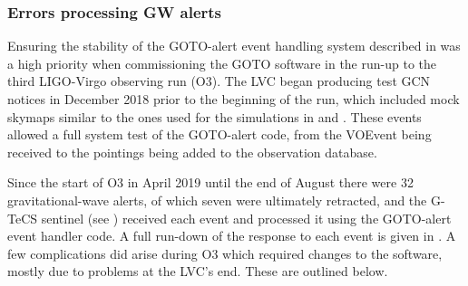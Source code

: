 \begin{colsection}
\clearpage

\subsubsection{Errors processing GW alerts}

Ensuring the stability of the GOTO-alert event handling system described in  was a high priority when commissioning the GOTO software in the run-up to the third LIGO-Virgo observing run (O3). The LVC began producing test GCN notices in December 2018 prior to the beginning of the run, which included mock skymaps similar to the ones used for the simulations in  and . These events allowed a full system test of the GOTO-alert code, from the VOEvent being received to the pointings being added to the observation database.

Since the start of O3 in April 2019 until the end of August there were 32 gravitational-wave alerts, of which seven were ultimately retracted, and the G-TeCS sentinel (see ) received each event and processed it using the GOTO-alert event handler code. A full run-down of the response to each event is given in . A few complications did arise during O3 which required changes to the software, mostly due to problems at the LVC's end. These are outlined below.


\end{colsection}
